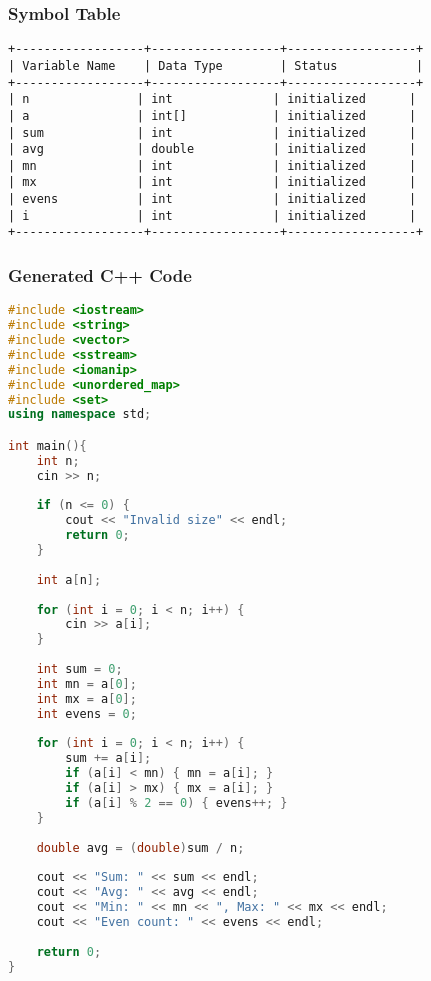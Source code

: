 \documentclass[12pt,a4paper]{article}
\begin{document}
\subsubsection{Symbol Table}

\begin{lstlisting}[caption=Output: output_symbol_table.txt]
+------------------+------------------+------------------+
| Variable Name    | Data Type        | Status           |
+------------------+------------------+------------------+
| n               | int              | initialized      |
| a               | int[]            | initialized      |
| sum             | int              | initialized      |
| avg             | double           | initialized      |
| mn              | int              | initialized      |
| mx              | int              | initialized      |
| evens           | int              | initialized      |
| i               | int              | initialized      |
+------------------+------------------+------------------+
\end{lstlisting}

\subsubsection{Generated C++ Code}

\begin{lstlisting}[language=C++, caption=Generated Output: transpiled.cpp]
#include <iostream>
#include <string>
#include <vector>
#include <sstream>
#include <iomanip>
#include <unordered_map>
#include <set>
using namespace std;

int main(){
    int n;
    cin >> n;
    
    if (n <= 0) {
        cout << "Invalid size" << endl;
        return 0;
    }
    
    int a[n];
    
    for (int i = 0; i < n; i++) {
        cin >> a[i];
    }
    
    int sum = 0;
    int mn = a[0];
    int mx = a[0];
    int evens = 0;
    
    for (int i = 0; i < n; i++) {
        sum += a[i];
        if (a[i] < mn) { mn = a[i]; }
        if (a[i] > mx) { mx = a[i]; }
        if (a[i] % 2 == 0) { evens++; }
    }
    
    double avg = (double)sum / n;
    
    cout << "Sum: " << sum << endl;
    cout << "Avg: " << avg << endl;
    cout << "Min: " << mn << ", Max: " << mx << endl;
    cout << "Even count: " << evens << endl;
    
    return 0;
}
\end{lstlisting}
\end{document}
